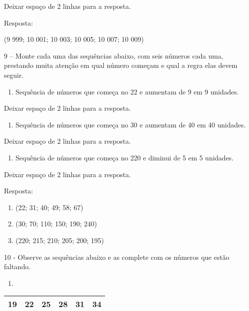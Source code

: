 Deixar espaço de 2 linhas para a resposta.

Resposta:

(9 999; 10 001; 10 003; 10 005; 10 007; 10 009)

9 -- Monte cada uma das sequências abaixo, com seis números cada uma,
prestando muita atenção em qual número começam e qual a regra elas devem
seguir.

\begin{enumerate}
\def\labelenumi{\alph{enumi})}
\item
  Sequência de números que começa no 22 e aumentam de 9 em 9 unidades.
\end{enumerate}

Deixar espaço de 2 linhas para a resposta.

\begin{enumerate}
\def\labelenumi{\alph{enumi})}
\item
  Sequência de números que começa no 30 e aumentam de 40 em 40 unidades.
\end{enumerate}

Deixar espaço de 2 linhas para a resposta.

\begin{enumerate}
\def\labelenumi{\alph{enumi})}
\item
  Sequência de números que começa no 220 e diminui de 5 em 5 unidades.
\end{enumerate}

Deixar espaço de 2 linhas para a resposta.

Resposta:

\begin{enumerate}
\def\labelenumi{\alph{enumi})}
\item
  (22; 31; 40; 49; 58; 67)
\item
  (30; 70; 110; 150; 190; 240)
\item
  (220; 215; 210; 205; 200; 195)
\end{enumerate}

10 - Observe as sequências abaixo e as complete com os números que estão
faltando.

\begin{enumerate}
\def\labelenumi{\alph{enumi})}
\item
\end{enumerate}

\begin{longtable}[]{@{}llllll@{}}
\toprule
19 & 22 & 25 & 28 & 31 & 34\tabularnewline
\bottomrule
\end{longtable}

